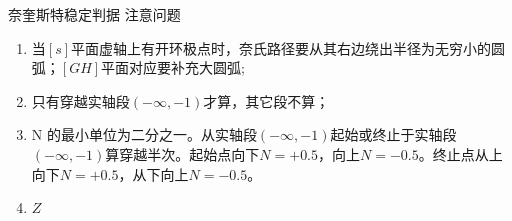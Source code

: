 \documentclass[handout,cjkutf8,table,aspectratio=1610]{beamer} %
\begin{document}
\begin{frame}{奈奎斯特稳定判据}
	\textsf{注意问题}\\
	\begin{enumerate}[(1)]
		\item 当$[s]$平面虚轴上有开环极点时，奈氏路径要从其右边绕出半径为无穷小的圆弧；$[GH]$平面对应要补充大圆弧;
		\item 只有穿越实轴段$(-\infty,-1)$才算，其它段不算；
		\item N 的最小单位为二分之一。从实轴段$(-\infty,-1)$起始或终止于实轴段$(-\infty,-1)$算穿越半次。起始点向下$N=+0.5$，向上$N=-0.5$。终止点从上向下$N=+0.5$，从下向上$N=-0.5$。
		\item $Z$
	\end{enumerate}
\end{frame}
\end{document}
